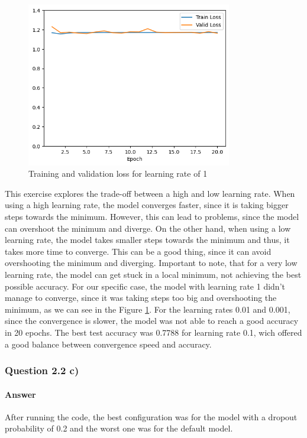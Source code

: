 \documentclass{article}
\begin{document}
\begin{figure}[H]
    \centering
    \includegraphics[width=0.8\textwidth]{"plots/mlp-training-loss-batch-16-lr-1.0-epochs-20-hidden-200-dropout-0.0-l2-0-layers-2-act-relu-opt-sgd.png"}
    \caption{Training and validation loss for learning rate of 1}
    \label{2.2b learning rate 1}
\end{figure}

This exercise explores the trade-off between a high and low learning rate. When using a high learning rate, the model converges faster, since it is taking bigger steps towards the minimum. 
However, this can lead to problems, since the model can overshoot the minimum and diverge. On the other hand, when using a low learning rate, the model takes smaller steps towards 
the minimum and thus, it takes more time to converge. This can be a good thing, since it can avoid overshooting the minimum and diverging. Important to note, that for a very low learning rate,
the model can get stuck in a local minimum, not achieving the best possible accuracy. For our specific case, the model with learning rate 1 didn't manage to converge, since it was taking steps too big and
overshooting the minimum, as we can see in the Figure \ref{2.2b learning rate 1}. For the learning rates 0.01 and 0.001, since the convergence is slower, 
the model was not able to reach a good accuracy in 20 epochs. The best test accuracy was 0.7788 for learning rate 0.1, wich offered a good balance between convergence speed and accuracy.

\subsubsection{Question 2.2 c)}
\paragraph{Answer} After running the code, the best configuration was for the model with a dropout probability of 0.2 and the worst one was for the default model.
\end{document}

